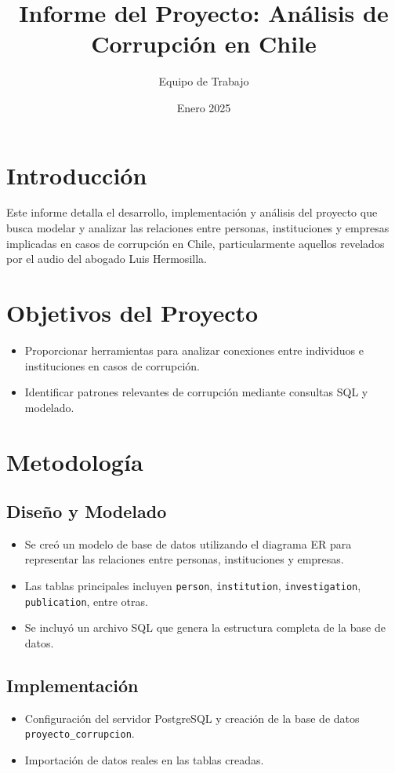 \documentclass[a4paper, 12pt]{article}
\title{\textbf{Informe del Proyecto: Análisis de Corrupción en Chile}}
\author{Equipo de Trabajo}
\date{Enero 2025}
\begin{document}
\maketitle

\section*{Introducción}
Este informe detalla el desarrollo, implementación y análisis del proyecto que busca modelar y analizar las relaciones entre personas, instituciones y empresas implicadas en casos de corrupción en Chile, particularmente aquellos revelados por el audio del abogado Luis Hermosilla.

\section*{Objetivos del Proyecto}
\begin{itemize}
    \item Proporcionar herramientas para analizar conexiones entre individuos e instituciones en casos de corrupción.
    \item Identificar patrones relevantes de corrupción mediante consultas SQL y modelado.
\end{itemize}

\section*{Metodología}

\subsection*{Diseño y Modelado}
\begin{itemize}
    \item Se creó un modelo de base de datos utilizando el diagrama ER para representar las relaciones entre personas, instituciones y empresas.
    \item Las tablas principales incluyen \texttt{person}, \texttt{institution}, \texttt{investigation}, \texttt{publication}, entre otras.
    \item Se incluyó un archivo SQL que genera la estructura completa de la base de datos.
\end{itemize}

\subsection*{Implementación}
\begin{itemize}
    \item Configuración del servidor PostgreSQL y creación de la base de datos \texttt{proyecto\_corrupcion}.
    \item Importación de datos reales en las tablas creadas.
\end{itemize}
\end{document}
